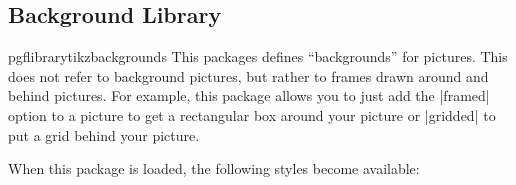 \subsection{Background Library}

\label{section-tikz-backgrounds}

\begin{package}{pgflibrarytikzbackgrounds}
  This packages defines ``backgrounds'' for pictures. This does not
  refer to background pictures, but rather to frames drawn around and
  behind pictures. For example, this package allows you to just add
  the |framed| option to a picture to get a rectangular box around
  your picture or |gridded| to put a grid behind your picture.
\end{package}

When this package is loaded, the following styles become available:
